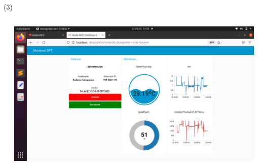 \begin{frame}{ (3)}
\begin{columns}
\begin{column}{0.20\textwidth}
\end{column} 
\begin{column}{0.50\textwidth}  
         \includegraphics[width=0.98\textwidth]{2022_HidroponicosDavid/figs/servidor}
\end{column} 
\end{columns} 
\end{frame}






